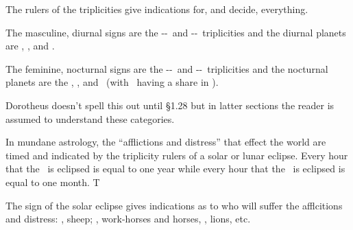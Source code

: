The rulers of the triplicities give indications for, and decide, everything.

\begin{mdframed}[backgroundcolor=cyan!5, rightmargin=1em, leftmargin=1em]
\footnotesize
The masculine, diurnal signs are the \Aries-\Leo-\Sagittarius\, and \Gemini-\Libra-\Aquarius\, triplicities and the diurnal planets are \Sun, \Jupiter, and \Saturn.

The feminine, nocturnal signs are the \Taurus-\Virgo-\Capricorn\, and \Cancer-\Scorpio-\Pisces\, triplicities and the nocturnal planets are the \Moon, \Venus, and \Mars\, (with \Mercury\, having a share in \Virgo).

Dorotheus doesn't spell this out until \S{1.28} but in latter sections the reader is assumed to understand these categories.
\end{mdframed}

In mundane astrology, the ``afflictions and distress'' that effect the world are timed and indicated by the triplicity rulers of a solar or lunar eclipse. Every hour that the \Sun\, is eclipsed is equal to one year while every hour that the \Moon\, is eclipsed is equal to one month. T

The sign of the solar eclipse gives indications as to who will suffer the afflcitions and distress: \Aries, sheep; \Sagittarius, work-horses and horses, \Leo, lions, etc.
